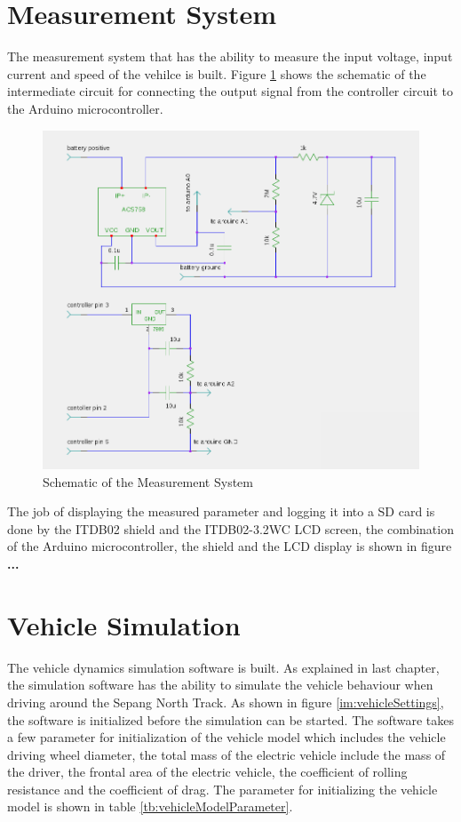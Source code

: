 \section{Measurement System}
The measurement system that has the ability to measure the input voltage, input current and speed of the vehilce is built. Figure \ref{im:sch} shows the schematic of the intermediate circuit for connecting the output signal from the controller circuit to the Arduino microcontroller. 

\begin{figure}[htb]
	\centering
	\includegraphics[width=5in]{images/sch.png}
	\caption{Schematic of the Measurement System}
	\label{im:sch}
\end{figure}

The job of displaying the measured parameter and logging it into a SD card is done by the ITDB02 shield and the ITDB02-3.2WC LCD screen, the combination of the Arduino microcontroller, the shield and the LCD display is shown in figure \textbf{...}

\section{Vehicle Simulation}
The vehicle dynamics simulation software is built. As explained in last chapter, the simulation software has the ability to simulate the vehicle behaviour when driving around the Sepang North Track. As shown in figure \ref{im:vehicleSettings}, the software is initialized before the simulation can be started. The software takes a few parameter for initialization of the vehicle model which includes the vehicle driving wheel diameter, the total mass of the electric vehicle include the mass of the driver, the frontal area of the electric vehicle, the coefficient of rolling resistance and the coefficient of drag. The parameter for initializing the vehicle model is shown in table \ref{tb:vehicleModelParameter}.


